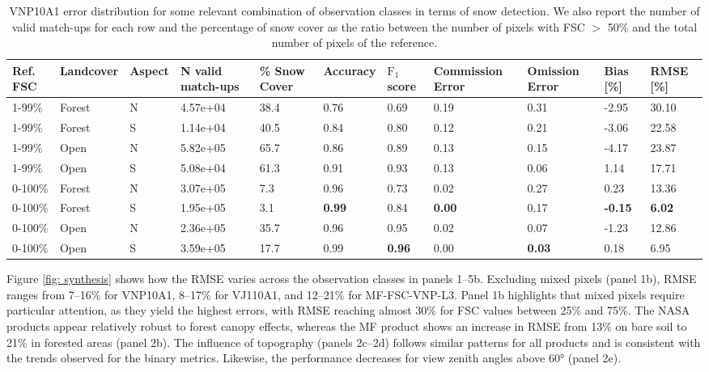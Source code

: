 \documentclass[tc, manuscript]{copernicus}
\begin{document}
\begin{table}[t]
    \caption{VNP10A1 error distribution for some relevant combination of observation classes in terms of snow detection. We also report the number of valid match-ups for each row and the percentage of snow cover as the ratio between the number of pixels with FSC $>$ 50\% and the total number of pixels of the reference.}
    \label{tab: tab04}
    \begin{tabular}{p{1.1cm}|p{1.1cm}p{0.9cm}|R{1.4cm}R{1.3cm}|R{1.2cm}R{1.2cm}R{1.3cm}R{1.3cm}|R{1.1cm}R{1.3cm}}
        \hline
        Ref. FSC & Landcover & Aspect &N valid match-ups&\% Snow Cover & Accuracy & $\mathrm{F_1}$ score & Commission Error & Omission Error & Bias [\%] & RMSE [\%] \\
        -99\% & Forest & N & 4.57e+04 & 38.4 & 0.76 & 0.69 & 0.19 & 0.31 & -2.95 & 30.10 \\
        1-99\% & Forest & S & 1.14e+04 & 40.5 & 0.84 & 0.80 & 0.12 & 0.21 & -3.06 & 22.58 \\
        1-99\% & Open & N & 5.82e+05 & 65.7 & 0.86 & 0.89 & 0.13 & 0.15 & -4.17 & 23.87 \\
        1-99\% & Open & S & 5.08e+04 & 61.3 & 0.91 & 0.93 & 0.13 & 0.06 & 1.14 & 17.71 \\
        0-100\% & Forest & N & 3.07e+05 & 7.3 & 0.96 & 0.73 & 0.02 & 0.27 & 0.23 & 13.36 \\
        0-100\% & Forest & S & 1.95e+05 & 3.1 & \bfseries 0.99 & 0.84 & \bfseries 0.00 & 0.17 & \bfseries -0.15 & \bfseries 6.02 \\
        0-100\% & Open & N & 2.36e+05 & 35.7 & 0.96 & 0.95 & 0.02 & 0.07 & -1.23 & 12.86 \\
        0-100\% & Open & S & 3.59e+05 & 17.7 & 0.99 & \bfseries 0.96 & 0.00 & \bfseries 0.03 &  0.18 & 6.95 \\
        \hline
    \end{tabular}
\end{table}


Figure \ref{fig: synthesis} shows how the RMSE varies across the observation classes in panels 1–5b. Excluding mixed pixels (panel 1b), RMSE ranges from 7–16\% for VNP10A1, 8–17\% for VJ110A1, and 12–21\% for MF-FSC-VNP-L3. Panel 1b highlights that mixed pixels require particular attention, as they yield the highest errors, with RMSE reaching almost 30\% for FSC values between 25\% and 75\%. The NASA products appear relatively robust to forest canopy effects, whereas the MF product shows an increase in RMSE from 13\% on bare soil to 21\% in forested areas (panel 2b). The influence of topography (panels 2c–2d) follows similar patterns for all products and is consistent with the trends observed for the binary metrics. Likewise, the performance decreases for view zenith angles above 60° (panel 2e).
\end{document}
